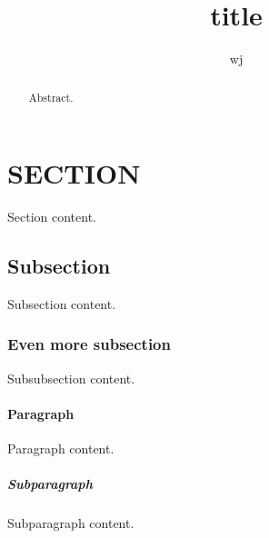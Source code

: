 \documentclass[12pt]{memoir}
\begin{document}
\title{title}
\author{wj}
\date{}
\maketitle

\renewcommand{\abstractname}{abstract}
\begin{abstract}
Abstract.
\end{abstract}



\section{SECTION}	%
Section content.

\subsection{Subsection}
Subsection content.

\subsubsection{Even more subsection}
Subsubsection content.

\paragraph{Paragraph}
Paragraph content.

\subparagraph{Subparagraph}
Subparagraph content.
\end{document}
